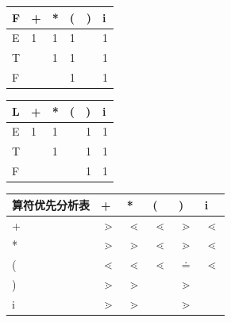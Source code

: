 \documentclass[UTF8]{ctexart} %
\begin{document}
\begin{table}[H]
    \centering
    \begin{tabular}{|p{2cm}<{\centering}|p{1cm}<{\centering}|p{1cm}<{\centering}|p{1cm}<{\centering}|p{1cm}<{\centering}|p{1cm}<{\centering}|}
        \hline
        F & + & * & ( & ) & i \\
        \hline
        E & 1 & 1 & 1 &   & 1 \\
        T &   & 1 & 1 &   & 1 \\
        F &   &   & 1 &   & 1
    \end{tabular}
\end{table}

\begin{table}[H]
    \centering
    \begin{tabular}{|p{2cm}<{\centering}|p{1cm}<{\centering}|p{1cm}<{\centering}|p{1cm}<{\centering}|p{1cm}<{\centering}|p{1cm}<{\centering}|}
        \hline
        L & + & * & ( & ) & i \\
        \hline
        E & 1 & 1 &   & 1 & 1 \\
        T &   & 1 &   & 1 & 1 \\
        F &   &   &   & 1 & 1
    \end{tabular}
\end{table}

\begin{table}[H]
    \centering
    \begin{tabular}{|p{3cm}<{\centering}|p{1cm}<{\centering}|p{1cm}<{\centering}|p{1cm}<{\centering}|p{1cm}<{\centering}|p{1cm}<{\centering}|}
        \hline
        算符优先分析表 & +          & *          & (          & )         & i          \\
        \hline
        +       & $\gtrdot$  & $\lessdot$ & $\lessdot$ & $\gtrdot$ & $\lessdot$ \\
        \hline
        *       & $\gtrdot$  & $\gtrdot$  & $\lessdot$ & $\gtrdot$ & $\lessdot$ \\
        \hline
        (       & $\lessdot$ & $\lessdot$ & $\lessdot$ & $\doteq$  & $\lessdot$ \\
        \hline
        )       & $\gtrdot$  & $\gtrdot$  &            & $\gtrdot$ &            \\
        \hline
        i       & $\gtrdot$  & $\gtrdot$  &            & $\gtrdot$ &            \\
        \hline
    \end{tabular}
\end{table}
\end{document}
